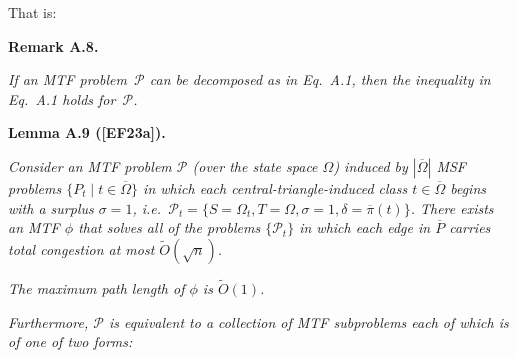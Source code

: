\documentclass[10pt,a4paper]{article}
\begin{document}
That is:\par





\par\medskip\noindent\textbf{\textbf{Remark A.8}\textbf{.}}\par



\emph{If an MTF problem $\mathcal{P}$ can be decomposed as in Eq. A.1, then the inequality in Eq. A.1 holds for $\mathcal{P}$.}\par







\par\medskip\noindent\textbf{\textbf{Lemma A.9}\textbf{ }([EF23a])\textbf{.}}\par



\emph{Consider an MTF problem $\mathcal{P}$ (over the state space $\Omega$) induced by $|\overline{\Omega}|$ MSF problems $\{P_{t}\mid t\in\overline{\Omega}\}$ in which each central-triangle-induced class $t\in\overline{\Omega}$ begins with a surplus $\sigma=1$, i.e. $\mathcal{P}_{t}=\{S=\Omega_{t},T=\Omega,\sigma=1,\delta=\overline{\pi}(t)\}$. There exists an MTF $\phi$ that solves all of the problems $\{\mathcal{P}_{t}\}$ in which each edge in $\overline{P}$ carries total congestion at most $\widetilde{O}(\sqrt{n})$.}\par




\emph{The maximum path length of $\phi$ is $\widetilde{O}(1)$.}\par




\emph{Furthermore, $\mathcal{P}$ is equivalent to a collection of MTF subproblems each of which is of one of two forms:}\par
\end{document}
